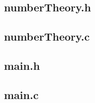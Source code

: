 \documentclass[]{article}
\begin{document}
\subsection*{numberTheory.h}
\pagebreak{}
\subsection*{numberTheory.c}
\pagebreak{}
\subsection*{main.h}
\pagebreak{}
\subsection*{main.c}
\pagebreak{}


\break
\setlength{}
\printbibliography[title={References}]

\end{document}

